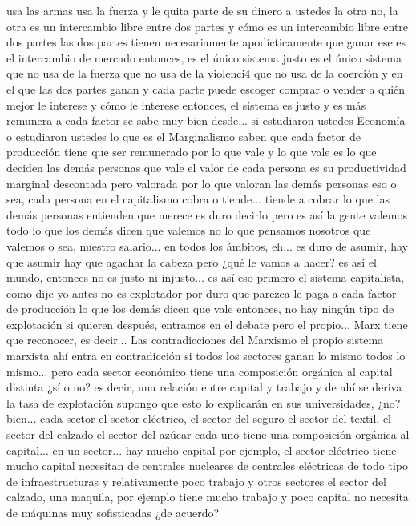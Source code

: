 usa las armas usa la fuerza y le quita parte de su dinero a ustedes la otra no, la otra
es un intercambio libre entre dos partes y cómo es un intercambio libre entre dos partes las dos partes
tienen necesariamente apodícticamente que ganar
ese es el intercambio de mercado entonces, es el único sistema justo es el único sistema que no usa de la fuerza
que no usa de la violenci4 que no usa de la coerción y en el que las dos partes ganan y cada parte puede escoger
comprar o vender a quién mejor le interese y cómo le interese entonces, el sistema es justo y es más remunera a cada factor
se sabe muy bien desde... si estudiaron ustedes Economía o estudiaron ustedes lo que es el Marginalismo saben que cada factor de producción
tiene que ser remunerado por lo que vale y lo que vale es lo que deciden las demás personas que vale
el valor de cada persona es su productividad marginal descontada pero valorada
por lo que valoran las demás personas eso o sea, cada persona en el capitalismo cobra o tiende... tiende a cobrar
lo que las demás personas entienden que merece es duro decirlo pero es así la gente valemos todo
lo que los demás dicen que valemos no lo que pensamos nosotros que valemos o sea, nuestro salario... en todos los ámbitos, eh...
es duro de asumir, hay que asumir hay que agachar la cabeza pero ¿qué le vamos a hacer? es así el mundo, entonces no es justo ni injusto... es así
eso primero el sistema capitalista, como dije yo antes no es explotador
por duro que parezca le paga a cada factor de producción lo que los demás dicen que vale entonces, no hay ningún tipo de explotación
si quieren después, entramos en el debate pero el propio... Marx tiene que reconocer, es decir...
Las contradicciones del Marxismo
el propio sistema marxista ahí entra en contradicción si todos los sectores ganan lo mismo
todos lo mismo... pero cada sector económico tiene una composición orgánica al capital distinta
¿sí o no? es decir, una relación entre capital y trabajo y de ahí se deriva
la tasa de explotación supongo que esto lo explicarán en sus universidades, ¿no? bien...
cada sector el sector eléctrico, el sector del seguro el sector del textil, el sector del calzado el sector del azúcar
cada uno tiene una composición orgánica al capital... en un sector...
hay mucho capital por ejemplo, el sector eléctrico tiene mucho capital necesitan de centrales nucleares de centrales eléctricas
de todo tipo de infraestructuras y relativamente poco trabajo y otros sectores el sector del calzado, una maquila, por ejemplo
tiene mucho trabajo y poco capital no necesita de máquinas muy sofisticadas ¿de acuerdo?
